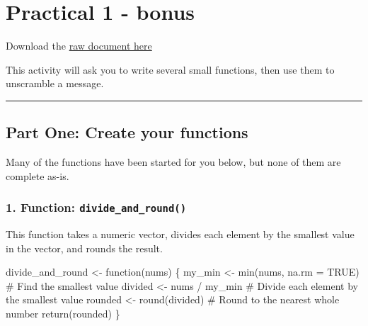 \documentclass[
  letterpaper,
  DIV=11,
  numbers=noendperiod]{scrartcl}
\subtitle{Writing R Functions}
\author{Team member Jakir Hossain \and Team member Syeda Noor ul Saba
Bukhari}
\date{2025-03-14}
\newenvironment{Shaded}{\begin{snugshade}}{\end{snugshade}}
\newcommand{\AttributeTok}[1]{\textcolor[rgb]{0.40,0.45,0.13}{#1}}
\newcommand{\CommentTok}[1]{\textcolor[rgb]{0.37,0.37,0.37}{#1}}
\newcommand{\ConstantTok}[1]{\textcolor[rgb]{0.56,0.35,0.01}{#1}}
\newcommand{\ControlFlowTok}[1]{\textcolor[rgb]{0.00,0.23,0.31}{#1}}
\newcommand{\FunctionTok}[1]{\textcolor[rgb]{0.28,0.35,0.67}{#1}}
\newcommand{\NormalTok}[1]{\textcolor[rgb]{0.00,0.23,0.31}{#1}}
\newcommand{\OtherTok}[1]{\textcolor[rgb]{0.00,0.23,0.31}{#1}}
\newcommand{\SpecialCharTok}[1]{\textcolor[rgb]{0.37,0.37,0.37}{#1}}
\begin{document}
\section*{Practical 1 - bonus}\label{practical-1---bonus}

Download the
\href{https://github.com/loreabad6/app-dev-gis/blob/main/practicals/Practical1-bonus/Practical1-bonus-Writing-Functions.qmd}{raw
document here}

This activity will ask you to write several small functions, then use
them to unscramble a message.

\begin{center}\rule{0.5\linewidth}{0.5pt}\end{center}

\subsection{Part One: Create your
functions}\label{part-one-create-your-functions}

Many of the functions have been started for you below, but none of them
are complete as-is.

\subsubsection{\texorpdfstring{1. Function:
\texttt{divide\_and\_round()}}{1. Function: divide\_and\_round()}}\label{function-divide_and_round}

This function takes a numeric vector, divides each element by the
smallest value in the vector, and rounds the result.

\begin{Shaded}
\begin{Highlighting}[]
\NormalTok{divide\_and\_round }\OtherTok{\textless{}{-}} \ControlFlowTok{function}\NormalTok{(nums) \{}
\NormalTok{  my\_min }\OtherTok{\textless{}{-}} \FunctionTok{min}\NormalTok{(nums, }\AttributeTok{na.rm =} \ConstantTok{TRUE}\NormalTok{)  }\CommentTok{\# Find the smallest value}
\NormalTok{  divided }\OtherTok{\textless{}{-}}\NormalTok{ nums }\SpecialCharTok{/}\NormalTok{ my\_min           }\CommentTok{\# Divide each element by the smallest value}
\NormalTok{  rounded }\OtherTok{\textless{}{-}} \FunctionTok{round}\NormalTok{(divided)          }\CommentTok{\# Round to the nearest whole number}
  \FunctionTok{return}\NormalTok{(rounded)}
\NormalTok{\}}
\end{Highlighting}
\end{Shaded}
\end{document}
